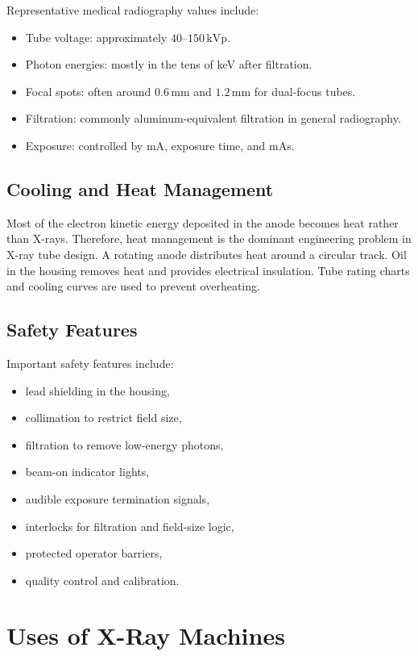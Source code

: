 \documentclass[12pt]{article}
\begin{document}
Representative medical radiography values include:
\begin{itemize}
    \item Tube voltage: approximately $40$--$150\,\mathrm{kVp}$.
    \item Photon energies: mostly in the tens of keV after filtration.
    \item Focal spots: often around $0.6\,\mathrm{mm}$ and $1.2\,\mathrm{mm}$ for dual-focus tubes.
    \item Filtration: commonly aluminum-equivalent filtration in general radiography.
    \item Exposure: controlled by mA, exposure time, and mAs.
\end{itemize}

\subsection{Cooling and Heat Management}

Most of the electron kinetic energy deposited in the anode becomes heat rather than X-rays. Therefore, heat management is the dominant engineering problem in X-ray tube design. A rotating anode distributes heat around a circular track. Oil in the housing removes heat and provides electrical insulation. Tube rating charts and cooling curves are used to prevent overheating.

\subsection{Safety Features}

Important safety features include:
\begin{itemize}
    \item lead shielding in the housing,
    \item collimation to restrict field size,
    \item filtration to remove low-energy photons,
    \item beam-on indicator lights,
    \item audible exposure termination signals,
    \item interlocks for filtration and field-size logic,
    \item protected operator barriers,
    \item quality control and calibration.
\end{itemize}

\section{Uses of X-Ray Machines}
\end{document}
